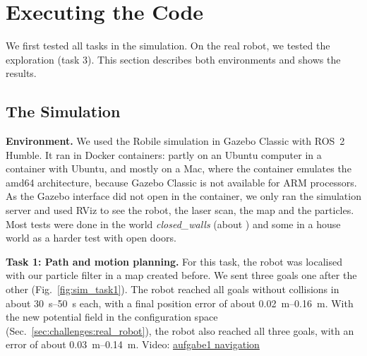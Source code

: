 \documentclass[../report.tex]{subfiles}
\begin{document}
    \section{Executing the Code}
    \label{sec:executing_code}


    We first tested all tasks in the simulation. On the real robot, we tested the exploration (task 3).
    This section describes both environments and shows the results.

    \subsection{The Simulation}
    \label{sec:executing_code:simulation}


    \textbf{Environment.}
    We used the Robile simulation in Gazebo Classic with ROS~2 Humble.
    It ran in Docker containers: partly on an Ubuntu computer in a container with Ubuntu, and mostly on a Mac, where the container emulates the amd64 architecture, because Gazebo Classic is not available for ARM processors.
    As the Gazebo interface did not open in the container, we only ran the simulation server and used RViz to see the robot, the laser scan, the map and the particles.
    Most tests were done in the world \emph{closed\_walls} (about ) and some in a house world as a harder test with open doors.

    \textbf{Task 1: Path and motion planning.}
    For this task, the robot was localised with our particle filter in a map created before.
    We sent three goals one after the other (Fig.~\ref{fig:sim_task1}).
    The robot reached all goals without collisions in about \SIrange{30}{50}{s} each, with a final position error of about \SIrange{0.02}{0.16}{m}.
    With the new potential field in the configuration space (Sec.~\ref{sec:challenges:real_robot}), the robot also reached all three goals, with an error of about \SIrange{0.03}{0.14}{m}.
    Video: \href{https://youtu.be/eph5LCBV-MY}{aufgabe1 navigation}
\end{document}
